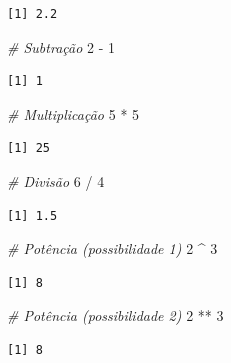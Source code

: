\documentclass[
  brazilian,
]{book}
\newenvironment{Shaded}{\begin{snugshade}}{\end{snugshade}}
\newcommand{\CommentTok}[1]{\textcolor[rgb]{0.56,0.35,0.01}{\textit{#1}}}
\newcommand{\DecValTok}[1]{\textcolor[rgb]{0.00,0.00,0.81}{#1}}
\newcommand{\SpecialCharTok}[1]{\textcolor[rgb]{0.00,0.00,0.00}{#1}}
\begin{document}
\begin{verbatim}
[1] 2.2
\end{verbatim}

\begin{Shaded}
\begin{Highlighting}[]
\CommentTok{\# Subtração}
\DecValTok{2} \SpecialCharTok{{-}} \DecValTok{1}
\end{Highlighting}
\end{Shaded}

\begin{verbatim}
[1] 1
\end{verbatim}

\begin{Shaded}
\begin{Highlighting}[]
\CommentTok{\# Multiplicação}
\DecValTok{5} \SpecialCharTok{*} \DecValTok{5}
\end{Highlighting}
\end{Shaded}

\begin{verbatim}
[1] 25
\end{verbatim}

\begin{Shaded}
\begin{Highlighting}[]
\CommentTok{\# Divisão}
\DecValTok{6} \SpecialCharTok{/} \DecValTok{4}
\end{Highlighting}
\end{Shaded}

\begin{verbatim}
[1] 1.5
\end{verbatim}

\begin{Shaded}
\begin{Highlighting}[]
\CommentTok{\# Potência (possibilidade 1)}
\DecValTok{2} \SpecialCharTok{\^{}} \DecValTok{3}
\end{Highlighting}
\end{Shaded}

\begin{verbatim}
[1] 8
\end{verbatim}

\begin{Shaded}
\begin{Highlighting}[]
\CommentTok{\# Potência (possibilidade 2)}
\DecValTok{2} \SpecialCharTok{**} \DecValTok{3}
\end{Highlighting}
\end{Shaded}

\begin{verbatim}
[1] 8
\end{verbatim}
\end{document}
